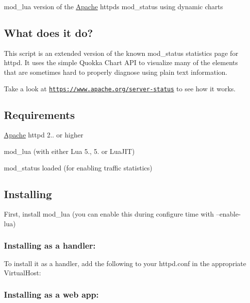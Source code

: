 {\ttfamily mod\+\_\+lua} version of the \hyperlink{namespaceApache}{Apache} httpd\textquotesingle{}s mod\+\_\+status using dynamic charts

\subsection*{What does it do?}

This script is an extended version of the known mod\+\_\+status statistics page for httpd. It uses the simple Quokka Chart A\+PI to visualize many of the elements that are sometimes hard to properly diagnose using plain text information.

Take a look at \href{https://www.apache.org/server-status}{\tt https\+://www.\+apache.\+org/server-\/status} to see how it works.

\subsection*{Requirements}


\begin{DoxyItemize}
\item \hyperlink{namespaceApache}{Apache} httpd 2.. or higher
\item mod\+\_\+lua (with either Lua 5., 5. or Lua\+J\+IT)
\item mod\+\_\+status loaded (for enabling traffic statistics)
\end{DoxyItemize}

\subsection*{Installing}

First, install mod\+\_\+lua (you can enable this during configure time with --enable-\/lua)

\subsubsection*{Installing as a handler\+:}

To install it as a handler, add the following to your httpd.\+conf in the appropriate Virtual\+Host\+: 


\subsubsection*{Installing as a web app\+:}

